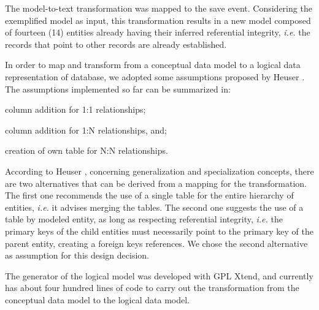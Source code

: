 \documentclass[a4paper,twoside,anonymous]{article}
\begin{document}
The model-to-text transformation was mapped to the save event. Considering the exemplified model as input, this transformation results in a new model composed of fourteen (14) entities already having their inferred referential integrity, \textit{i.e.} the records that point to other records are already established.

In order to map and transform from a conceptual data model to a logical data representation of database, we adopted some assumptions proposed by Heuser \cite{Heuser:2009}.
The assumptions implemented so far can be summarized in:
\begin{inparaenum}[(i)]
\item column addition for 1:1 relationships;
\item column addition for 1:N relationships, and;
\item creation of own table for N:N relationships.
\end{inparaenum}


According to Heuser \cite{Heuser:2009}, concerning generalization and specialization concepts, there are two alternatives that can be derived from a mapping for the transformation.
The first one recommends the use of a single table for the entire hierarchy of entities, \textit{i.e.} it advises merging the tables.
The second one suggests the use of a table by modeled entity, as long as respecting referential integrity, \textit{i.e.} the primary keys of the child entities must necessarily point to the primary key of the parent entity, creating a foreign keys references.
We chose the second alternative as assumption for this design decision.

The generator of the logical model was developed with GPL Xtend, and currently has about four hundred lines of code to carry out the transformation from the conceptual data model to the logical data model.
\end{document}
